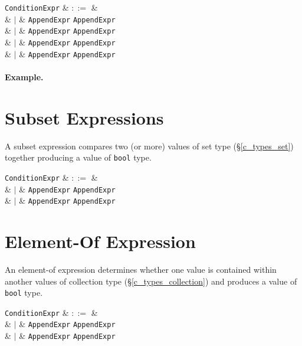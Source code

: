\begin{syntax}
  \verb+ConditionExpr+ & $::=$ &\\
  & $|$ & \verb+AppendExpr+ \token{<} \verb+AppendExpr+\\
  & $|$ & \verb+AppendExpr+ \token{<=} \verb+AppendExpr+\\
  & $|$ & \verb+AppendExpr+ \token{=>} \verb+AppendExpr+\\
  & $|$ & \verb+AppendExpr+ \token{>} \verb+AppendExpr+\\
\end{syntax}

\paragraph{Example.}

\section{Subset Expressions}
\label{c_expr_relational}
A subset expression compares two (or more) values of set type (\S\ref{c_types_set}) together producing a value of \lstinline{bool} type.  

\begin{syntax}
  \verb+ConditionExpr+ & $::=$ &\\
  & $|$ & \verb+AppendExpr+ \token{$\subset$} \verb+AppendExpr+\\
  & $|$ & \verb+AppendExpr+ \token{$\subseteq$} \verb+AppendExpr+\\
\end{syntax}

\section{Element-Of Expression}
\label{c_expr_relational}
An element-of expression determines whether one value is contained within another values of collection type (\S\ref{c_types_collection}) and produces a value of \lstinline{bool} type.  

\begin{syntax}
  \verb+ConditionExpr+ & $::=$ &\\
  & $|$ & \verb+AppendExpr+  \verb+AppendExpr+\\
  & $|$ & \verb+AppendExpr+ \token{$\in$} \verb+AppendExpr+\\
\end{syntax}



